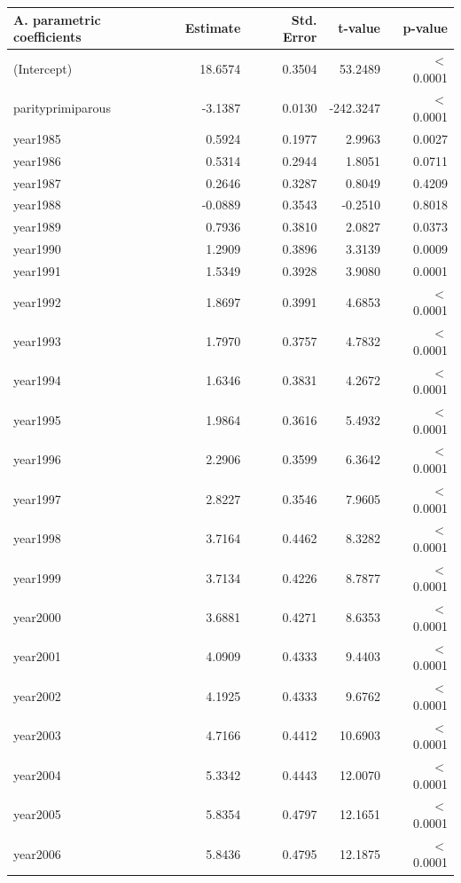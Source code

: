     \begin{table}[H]
    \centering
    \begin{tabular}{lrrrr}
    \textbf{A. parametric coefficients} & Estimate & Std. Error & t-value & p-value \\ 
       \hline
       \hline
      (Intercept) & 18.6574 & 0.3504 & 53.2489 & $<$ 0.0001 \\ 
      parityprimiparous & -3.1387 & 0.0130 & -242.3247 & $<$ 0.0001 \\ 
      year1985 & 0.5924 & 0.1977 & 2.9963 & 0.0027 \\ 
      year1986 & 0.5314 & 0.2944 & 1.8051 & 0.0711 \\ 
      year1987 & 0.2646 & 0.3287 & 0.8049 & 0.4209 \\ 
      year1988 & -0.0889 & 0.3543 & -0.2510 & 0.8018 \\ 
      year1989 & 0.7936 & 0.3810 & 2.0827 & 0.0373 \\ 
      year1990 & 1.2909 & 0.3896 & 3.3139 & 0.0009 \\ 
      year1991 & 1.5349 & 0.3928 & 3.9080 & 0.0001 \\ 
      year1992 & 1.8697 & 0.3991 & 4.6853 & $<$ 0.0001 \\ 
      year1993 & 1.7970 & 0.3757 & 4.7832 & $<$ 0.0001 \\ 
      year1994 & 1.6346 & 0.3831 & 4.2672 & $<$ 0.0001 \\ 
      year1995 & 1.9864 & 0.3616 & 5.4932 & $<$ 0.0001 \\ 
      year1996 & 2.2906 & 0.3599 & 6.3642 & $<$ 0.0001 \\ 
      year1997 & 2.8227 & 0.3546 & 7.9605 & $<$ 0.0001 \\ 
      year1998 & 3.7164 & 0.4462 & 8.3282 & $<$ 0.0001 \\ 
      year1999 & 3.7134 & 0.4226 & 8.7877 & $<$ 0.0001 \\ 
      year2000 & 3.6881 & 0.4271 & 8.6353 & $<$ 0.0001 \\ 
      year2001 & 4.0909 & 0.4333 & 9.4403 & $<$ 0.0001 \\ 
      year2002 & 4.1925 & 0.4333 & 9.6762 & $<$ 0.0001 \\ 
      year2003 & 4.7166 & 0.4412 & 10.6903 & $<$ 0.0001 \\ 
      year2004 & 5.3342 & 0.4443 & 12.0070 & $<$ 0.0001 \\ 
      year2005 & 5.8354 & 0.4797 & 12.1651 & $<$ 0.0001 \\ 
      year2006 & 5.8436 & 0.4795 & 12.1875 & $<$ 0.0001 \\ 

\end{tabular}
\end{table}
